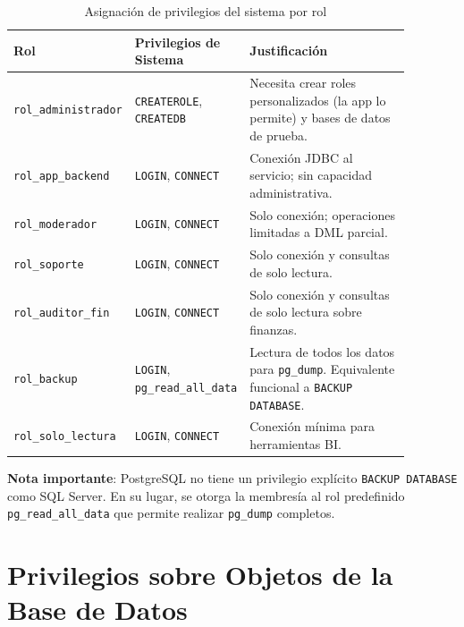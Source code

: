 \documentclass[conference, onecolumn]{IEEEtran}
\begin{document}
\begin{table}[H]
\centering
\caption{Asignación de privilegios del sistema por rol}
\label{tab:priv_sistema}
\scriptsize
\begin{tabular}{>{\raggedright\arraybackslash}p{0.22\linewidth} >{\raggedright\arraybackslash}p{0.24\linewidth} >{\raggedright\arraybackslash}p{0.42\linewidth}}
\toprule
\textbf{Rol} & \textbf{Privilegios de Sistema} & \textbf{Justificación} \\
\midrule
\texttt{rol\_administrador} & \texttt{CREATEROLE}, \texttt{CREATEDB} & Necesita crear roles personalizados (la app lo permite) y bases de datos de prueba. \\
\midrule
\texttt{rol\_app\_backend} & \texttt{LOGIN}, \texttt{CONNECT} & Conexión JDBC al servicio; sin capacidad administrativa. \\
\midrule
\texttt{rol\_moderador} & \texttt{LOGIN}, \texttt{CONNECT} & Solo conexión; operaciones limitadas a DML parcial. \\
\midrule
\texttt{rol\_soporte} & \texttt{LOGIN}, \texttt{CONNECT} & Solo conexión y consultas de solo lectura. \\
\midrule
\texttt{rol\_auditor\_fin} & \texttt{LOGIN}, \texttt{CONNECT} & Solo conexión y consultas de solo lectura sobre finanzas. \\
\midrule
\texttt{rol\_backup} & \texttt{LOGIN}, \texttt{pg\_read\_all\_data} & Lectura de todos los datos para \texttt{pg\_dump}. Equivalente funcional a \texttt{BACKUP DATABASE}. \\
\midrule
\texttt{rol\_solo\_lectura} & \texttt{LOGIN}, \texttt{CONNECT} & Conexión mínima para herramientas BI. \\
\bottomrule
\end{tabular}
\end{table}

\textbf{Nota importante}: PostgreSQL no tiene un privilegio explícito \texttt{BACKUP DATABASE} como SQL Server. En su lugar, se otorga la membresía al rol predefinido \texttt{pg\_read\_all\_data} que permite realizar \texttt{pg\_dump} completos.

\section{Privilegios sobre Objetos de la Base de Datos}
\end{document}
